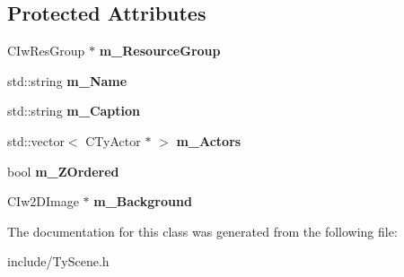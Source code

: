 \subsection*{Protected Attributes}
\begin{DoxyCompactItemize}
\item 
\hypertarget{class_c_ty_scene_a5468743fb3c74b70874aa62d949b918b}{
CIwResGroup $\ast$ {\bfseries m\_\-ResourceGroup}}
\label{class_c_ty_scene_a5468743fb3c74b70874aa62d949b918b}

\item 
\hypertarget{class_c_ty_scene_ad81b920909340266c2aba88805f7812a}{
std::string {\bfseries m\_\-Name}}
\label{class_c_ty_scene_ad81b920909340266c2aba88805f7812a}

\item 
\hypertarget{class_c_ty_scene_a7ebea53f2e91d94f3f6ba6aef7a40f5b}{
std::string {\bfseries m\_\-Caption}}
\label{class_c_ty_scene_a7ebea53f2e91d94f3f6ba6aef7a40f5b}

\item 
\hypertarget{class_c_ty_scene_aeb2c43a206900ddc526aed3ec18178f7}{
std::vector$<$ CTyActor $\ast$ $>$ {\bfseries m\_\-Actors}}
\label{class_c_ty_scene_aeb2c43a206900ddc526aed3ec18178f7}

\item 
\hypertarget{class_c_ty_scene_aef04104af22b290a7207b45852be15c1}{
bool {\bfseries m\_\-ZOrdered}}
\label{class_c_ty_scene_aef04104af22b290a7207b45852be15c1}

\item 
\hypertarget{class_c_ty_scene_a7d1206474a891c102b0940e55342757a}{
CIw2DImage $\ast$ {\bfseries m\_\-Background}}
\label{class_c_ty_scene_a7d1206474a891c102b0940e55342757a}

\end{DoxyCompactItemize}


The documentation for this class was generated from the following file:\begin{DoxyCompactItemize}
\item 
include/TyScene.h\end{DoxyCompactItemize}
